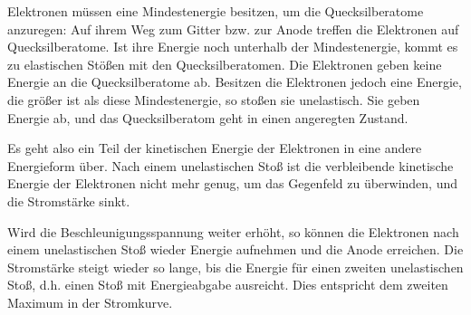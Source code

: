 \documentclass{tuftebook}
\begin{document}
    Elektronen müssen eine Mindestenergie besitzen, um die Quecksilberatome anzuregen: Auf ihrem Weg zum Gitter bzw. zur Anode treffen die Elektronen auf Quecksilberatome. Ist ihre Energie noch unterhalb der Mindestenergie, kommt es zu elastischen Stößen mit den Quecksilberatomen. Die Elektronen geben keine Energie an die Quecksilberatome ab. Besitzen die Elektronen jedoch eine Energie, die größer ist als diese Mindestenergie, so stoßen sie unelastisch. Sie geben Energie ab, und das Quecksilberatom geht in einen angeregten Zustand. 
        
        Es geht also ein Teil der kinetischen Energie der Elektronen in eine andere Energieform über. Nach einem unelastischen Stoß ist die verbleibende kinetische Energie der Elektronen nicht mehr genug, um das Gegenfeld zu überwinden, und die Stromstärke sinkt. 
        
        Wird die Beschleunigungsspannung weiter erhöht, so können die Elektronen nach einem unelastischen Stoß wieder Energie aufnehmen und die Anode erreichen. Die Stromstärke steigt wieder so lange, bis die Energie für einen zweiten unelastischen Stoß, d.h. einen Stoß mit Energieabgabe ausreicht. Dies entspricht dem zweiten Maximum in der Stromkurve.
        
\end{document}

